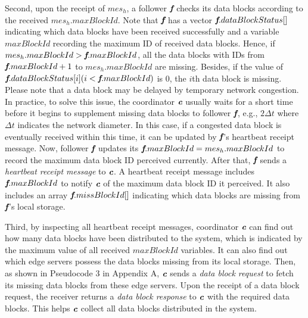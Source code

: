 \documentclass[10pt,journal,compsoc]{IEEEtran}
\def\mathbi#1{\textbf{\em #1}}
\begin{document}
Second, upon the receipt of $mes_h$, a follower $\mathbi{f}$ checks its data blocks according to the received $mes_h.maxBlockId$.  Note that $\mathbi{f}$ has a vector $\mathbi{f}.dataBlockStatus[]$ indicating which data blocks have been received successfully and a variable $maxBlockId$ recording the maximum ID of received data blocks. Hence, if $mes_h.maxBlockId > \mathbi{f}.maxBlockId$, all the data blocks with IDs from $\mathbi{f}.maxBlockId+1$ to $mes_h.maxBlockId$ are missing. Besides, if the value of $\mathbi{f}.dataBlockStatus[i] (i<\mathbi{f}.maxBlockId)$ is 0, the $i$th data block is missing.  Please note that a data block may be delayed by temporary network congestion. In practice, to solve this issue, the coordinator $\mathbi{c}$ usually waits for a short time before it begins to supplement missing data blocks to follower $\mathbi{f}$, e.g., $2\Delta t$ where $\Delta t$ indicates the network diameter. In this case, if a congested data block is eventually received within this time, it can be updated by $\mathbi{f}$'s heartbeat receipt message. Now, follower $\mathbi{f}$ updates its $\mathbi{f}.maxBlockId = mes_h.maxBlockId$ to record the maximum data block ID perceived currently. After that, $\mathbi{f}$ sends a \textit{heartbeat receipt message} to $\mathbi{c}$. A heartbeat receipt message includes $\mathbi{f}.maxBlockId$ to notify $\mathbi{c}$ of the maximum data block ID it perceived. It also includes an array $\mathbi{f}.missBlockId[]$ indicating which data blocks are missing from $\mathbi{f}$'s local storage.


Third, by inspecting all heartbeat receipt messages, coordinator $\mathbi{c}$ can find out how many data blocks have been distributed to the system, which is indicated by the maximum value of all received $maxBlockId$ variables. It can also find out which edge servers possess the data blocks missing from its local storage. Then, as shown in Pseudocode 3 in Appendix A, $\mathbi{c}$ sends a \textit{data block request} to fetch its missing data blocks from these edge servers. Upon the receipt of a data block request, the receiver returns a \textit{data block response} to $\mathbi{c}$ with the required data blocks. This helps $\mathbi{c}$ collect all data blocks distributed in the system.
\end{document}
